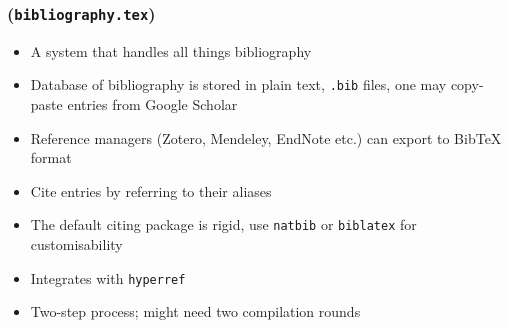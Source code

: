 \documentclass[xetex,colorlinks]{beamer} %
\begin{document}
  \subsubsection{}
  \begin{frame}
    \frametitle{ \\ (\texttt{bibliography.tex})}
    \begin{itemize}
     \item A system that handles all things bibliography
     \item Database of bibliography is stored in plain text, \texttt{.bib} files, one may copy-paste entries from Google Scholar
     \item Reference managers (Zotero, Mendeley, EndNote etc.) can export to BibTeX format
     \item Cite entries by referring to their aliases
     \item The default citing package is rigid, use \texttt{natbib} or \texttt{biblatex} for customisability
     \item Integrates with \texttt{hyperref}
     \item Two-step process; might need two compilation rounds
    \end{itemize}
  \end{frame}
  
\end{document}
